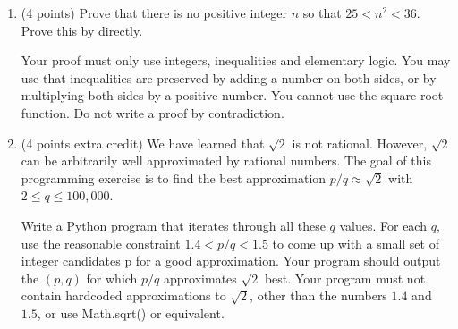 \documentclass{article}
\begin{document}
\begin{enumerate}
    \item (4 points) Prove that there is no positive integer $n$ so that $25 < n^2 < 36$. Prove this by directly. 
    
    Your proof must only use integers, inequalities and elementary logic. You may use that inequalities are preserved by adding a number on both sides, or by multiplying both sides by a positive number. You cannot use the square root function. Do not write a proof by contradiction.
    
    \item (4 points extra credit) We have learned that $\sqrt{2}$ is not rational. However, $\sqrt{2}$  can be arbitrarily well approximated by rational numbers. The goal of this programming exercise is to find the best approximation $p/q \approx \sqrt{2}$ with $2 \leq q \leq 100,000$.

    Write a Python program that iterates through all these $q$ values. For each $q$, use the reasonable constraint $1.4 < p/q < 1.5$ to come up with a small set of integer candidates p for a good approximation. Your program should output the $(p, q)$ for which $p/q$ approximates $\sqrt{2}$ best. Your program must not contain hardcoded approximations to $\sqrt{2}$, other than the numbers $1.4$ and $1.5$, or use Math.sqrt() or equivalent.
\end{enumerate}
\end{document}
